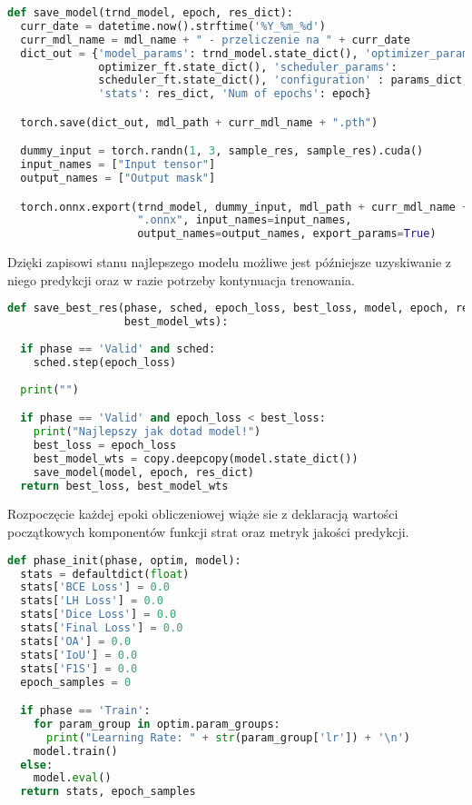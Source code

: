 \cell
\begin{lstlisting}[name=Rozdzial3.1, language=Python]
def save_model(trnd_model, epoch, res_dict):
  curr_date = datetime.now().strftime('%Y_%m_%d')
  curr_mdl_name = mdl_name + " - przeliczenie na " + curr_date
  dict_out = {'model_params': trnd_model.state_dict(), 'optimizer_params': 
              optimizer_ft.state_dict(), 'scheduler_params': 
              scheduler_ft.state_dict(), 'configuration' : params_dict, 
              'stats': res_dict, 'Num of epochs': epoch}

  torch.save(dict_out, mdl_path + curr_mdl_name + ".pth")

  dummy_input = torch.randn(1, 3, sample_res, sample_res).cuda()
  input_names = ["Input tensor"]
  output_names = ["Output mask"]

  torch.onnx.export(trnd_model, dummy_input, mdl_path + curr_mdl_name + 
                    ".onnx", input_names=input_names, 
                    output_names=output_names, export_params=True)
\end{lstlisting}


\cell
Dzięki zapisowi stanu najlepszego modelu możliwe jest późniejsze uzyskiwanie z niego predykcji oraz w razie potrzeby kontynuacja trenowania.

\cell
\begin{lstlisting}[name=Rozdzial3.1, language=Python]
def save_best_res(phase, sched, epoch_loss, best_loss, model, epoch, res_dict,
                  best_model_wts):
  
  if phase == 'Valid' and sched:
    sched.step(epoch_loss)
    
  print("")

  if phase == 'Valid' and epoch_loss < best_loss:
    print("Najlepszy jak dotad model!")
    best_loss = epoch_loss
    best_model_wts = copy.deepcopy(model.state_dict())
    save_model(model, epoch, res_dict)  
  return best_loss, best_model_wts
\end{lstlisting}


\cell
Rozpoczęcie każdej epoki obliczeniowej wiąże sie z deklaracją wartości początkowych komponentów funkcji strat oraz metryk jakości predykcji.

\cell
\begin{lstlisting}[name=Rozdzial3.1, language=Python]
def phase_init(phase, optim, model):
  stats = defaultdict(float)
  stats['BCE Loss'] = 0.0
  stats['LH Loss'] = 0.0
  stats['Dice Loss'] = 0.0
  stats['Final Loss'] = 0.0
  stats['OA'] = 0.0
  stats['IoU'] = 0.0
  stats['F1S'] = 0.0
  epoch_samples = 0

  if phase == 'Train':    
    for param_group in optim.param_groups:
      print("Learning Rate: " + str(param_group['lr']) + '\n')
    model.train() 
  else:
    model.eval()
  return stats, epoch_samples
\end{lstlisting}


